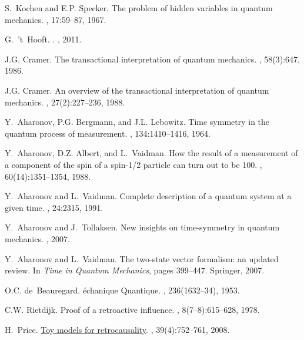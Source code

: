 \documentclass[11pt]{amsart}
\theoremstyle{definition}
\theoremstyle{plain}
\begin{document}
\begin{thebibliography}{10}
S.~Kochen and E.P. Specker.
\newblock The problem of hidden variables in quantum mechanics.
, 17:59--87, 1967.

G.~'t~Hooft.
.
, 2011.

J.G. Cramer.
\newblock The transactional interpretation of quantum mechanics.
, 58(3):647, 1986.

J.G. Cramer.
\newblock An overview of the transactional interpretation of quantum mechanics.
, 27(2):227--236, 1988.

Y.~Aharonov, P.G. Bergmann, and J.L. Lebowitz.
\newblock Time symmetry in the quantum process of measurement.
, 134:1410--1416, 1964.

Y.~Aharonov, D.Z. Albert, and L.~Vaidman.
\newblock How the result of a measurement of a component of the spin of a
  spin-1/2 particle can turn out to be 100.
, 60(14):1351--1354, 1988.

Y.~Aharonov and L.~Vaidman.
\newblock Complete description of a quantum system at a given time.
, 24:2315, 1991.

Y.~Aharonov and J.~Tollaksen.
\newblock New insights on time-symmetry in quantum mechanics.
, 2007.

Y.~Aharonov and L.~Vaidman.
\newblock The two-state vector formalism: an updated review.
\newblock In {\em Time in Quantum Mechanics}, pages 399--447. Springer, 2007.

O.C. de~Beauregard.
\'e{}chanique {Q}uantique.
, 236(1632--34), 1953.

C.W. Rietdijk.
\newblock Proof of a retroactive influence.
, 8(7--8):615--628, 1978.

H.~Price.
\newblock \href{http://philsci-archive.pitt.edu/3906/1/Helsinki.pdf}{Toy models
  for retrocausality}.
,
  39(4):752--761, 2008.


\end{thebibliography}
\end{document}
